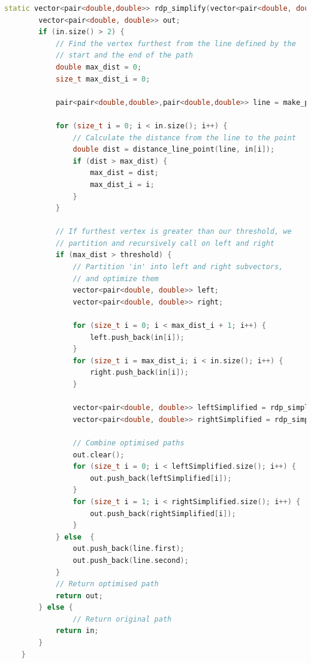 \documentclass[titlepage,12pt,a4paper]{article}
\begin{document}
\begin{lstlisting}[language=C++]
	static vector<pair<double,double>> rdp_simplify(vector<pair<double, double>> in, double threshold) {
        vector<pair<double, double>> out;
        if (in.size() > 2) {
            // Find the vertex furthest from the line defined by the
            // start and the end of the path
            double max_dist = 0;
            size_t max_dist_i = 0;      

            pair<pair<double,double>,pair<double,double>> line = make_pair(in.front(), in.back());
    
            for (size_t i = 0; i < in.size(); i++) {
            	// Calculate the distance from the line to the point
                double dist = distance_line_point(line, in[i]);
                if (dist > max_dist) {
                    max_dist = dist;
                    max_dist_i = i;
                }
            }

            // If furthest vertex is greater than our threshold, we
            // partition and recursively call on left and right
            if (max_dist > threshold) {
                // Partition 'in' into left and right subvectors,
                // and optimize them
                vector<pair<double, double>> left;
                vector<pair<double, double>> right;
                
                for (size_t i = 0; i < max_dist_i + 1; i++) {
                    left.push_back(in[i]);
                }
                for (size_t i = max_dist_i; i < in.size(); i++) { 
                    right.push_back(in[i]);
                }
	
                vector<pair<double, double>> leftSimplified = rdp_simplify(left, threshold);
                vector<pair<double, double>> rightSimplified = rdp_simplify(right, threshold);

                // Combine optimised paths
                out.clear();
                for (size_t i = 0; i < leftSimplified.size(); i++) {
                    out.push_back(leftSimplified[i]);
                }
                for (size_t i = 1; i < rightSimplified.size(); i++) {
                    out.push_back(rightSimplified[i]);
                }
            } else  {
                out.push_back(line.first);
                out.push_back(line.second);
            }
            // Return optimised path
            return out;
        } else {
        	    // Return original path
            return in;
        }
    }    
\end{lstlisting}
\end{document}
